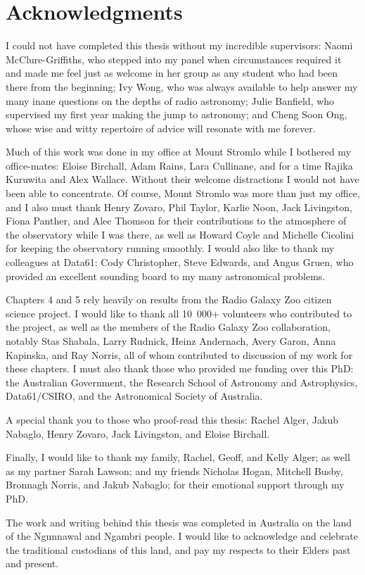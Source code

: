 \chapter*{Acknowledgments}

I could not have completed this thesis without my incredible supervisors: Naomi McClure-Griffiths, who stepped into my panel when circumstances required it and made me feel just as welcome in her group as any student who had been there from the beginning; Ivy Wong, who was always available to help answer my many inane questions on the depths of radio astronomy; Julie Banfield, who supervised my first year making the jump to astronomy; and Cheng Soon Ong, whose wise and witty repertoire of advice will resonate with me forever.

Much of this work was done in my office at Mount Stromlo while I bothered my office-mates: Eloise Birchall, Adam Rains, Lara Cullinane, and for a time Rajika Kuruwita and Alex Wallace. Without their welcome distractions I would not have been able to concentrate. Of course, Mount Stromlo was more than just my office, and I also must thank Henry Zovaro, Phil Taylor, Karlie Noon, Jack Livingston, Fiona Panther, and Alec Thomson for their contributions to the atmosphere of the observatory while I was there, as well as Howard Coyle and Michelle Cicolini for keeping the observatory running smoothly. I would also like to thank my colleagues at Data61: Cody Christopher, Steve Edwards, and Angus Gruen, who provided an excellent sounding board to my many astronomical problems.

Chapters 4 and 5 rely heavily on results from the Radio Galaxy Zoo citizen science project. I would like to thank all 10~000+ volunteers who contributed to the project, as well as the members of the Radio Galaxy Zoo collaboration, notably Stas Shabala, Larry Rudnick, Heinz Andernach, Avery Garon, Anna Kapinska, and Ray Norris, all of whom contributed to discussion of my work for these chapters. I must also thank those who provided me funding over this PhD: the Australian Government, the Research School of Astronomy and Astrophysics, Data61/CSIRO, and the Astronomical Society of Australia.

A special thank you to those who proof-read this thesis: Rachel Alger, Jakub Nabaglo, Henry Zovaro, Jack Livingston, and Eloise Birchall.

Finally, I would like to thank my family, Rachel, Geoff, and Kelly Alger; as well as my partner Sarah Lawson; and my friends Nicholas Hogan, Mitchell Busby, Bronnagh Norris, and Jakub Nabaglo; for their emotional support through my PhD.

\clearpage

The work and writing behind this thesis was completed in Australia on the land of the Ngunnawal and Ngambri people. I would like to acknowledge and celebrate the traditional custodians of this land, and pay my respects to their Elders past and present.
